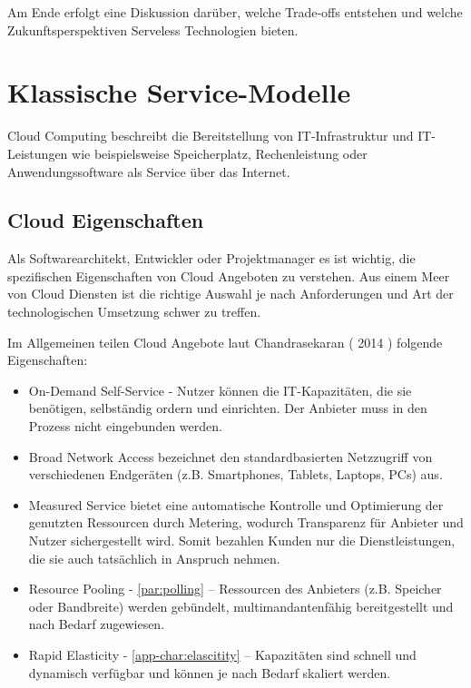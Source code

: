 \documentclass[
12pt,
english,
ngerman,
headsepline,
twoside,
openright,
numbers=noenddot,version=first
]{scrreprt}
\begin{document}
Am Ende erfolgt eine Diskussion darüber, welche Trade-offs entstehen und welche Zukunftsperspektiven Serveless Technologien bieten.


\chapter{Klassische Service-Modelle}
\label{chap:service-models}
\label{chap:principles}
Cloud Computing beschreibt die Bereitstellung von IT-Infrastruktur und IT-Leistungen wie beispielsweise Speicherplatz, Rechenleistung oder Anwendungssoftware als Service über das Internet.\cite{cloudEssentials}

\section{Cloud Eigenschaften}
\label{sec:cloud-char}
Als Softwarearchitekt, Entwickler oder Projektmanager es ist wichtig, die spezifischen Eigenschaften von Cloud Angeboten zu verstehen. Aus einem Meer von Cloud Diensten ist die richtige Auswahl je nach Anforderungen und Art der technologischen Umsetzung schwer zu treffen. 


Im Allgemeinen teilen Cloud Angebote laut Chandrasekaran ( 2014 ) folgende Eigenschaften:
\begin{itemize}
	\item On-Demand Self-Service - Nutzer können die IT-Kapazitäten, die sie benötigen, selbständig ordern und einrichten. Der Anbieter muss in den Prozess nicht eingebunden werden.
	\item Broad Network Access bezeichnet den standardbasierten Netzzugriff von verschiedenen Endgeräten (z.B. Smartphones, Tablets, Laptops, PCs) aus.
	\item Measured Service bietet eine automatische Kontrolle und Optimierung der genutzten Ressourcen durch Metering, wodurch Transparenz für Anbieter und Nutzer sichergestellt wird. Somit bezahlen Kunden nur die Dienstleistungen, die sie auch tatsächlich in Anspruch nehmen.
	\item Resource Pooling - \ref{par:polling} – Ressourcen des Anbieters (z.B. Speicher oder Bandbreite) werden gebündelt, multimandantenfähig bereitgestellt und nach Bedarf zugewiesen.
	\item Rapid Elasticity - \ref{app-char:elascitity} – Kapazitäten sind schnell und dynamisch verfügbar und können je nach Bedarf skaliert werden.\cite{cloudEssentials}
\end{itemize}
\end{document}
